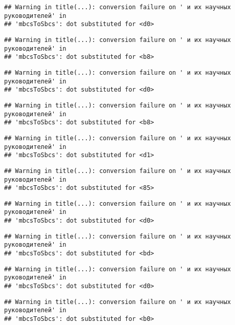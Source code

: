 \documentclass[
]{article}
\begin{document}
\begin{verbatim}
## Warning in title(...): conversion failure on ' и их научных руководителей' in
## 'mbcsToSbcs': dot substituted for <d0>
\end{verbatim}

\begin{verbatim}
## Warning in title(...): conversion failure on ' и их научных руководителей' in
## 'mbcsToSbcs': dot substituted for <b8>
\end{verbatim}

\begin{verbatim}
## Warning in title(...): conversion failure on ' и их научных руководителей' in
## 'mbcsToSbcs': dot substituted for <d0>
\end{verbatim}

\begin{verbatim}
## Warning in title(...): conversion failure on ' и их научных руководителей' in
## 'mbcsToSbcs': dot substituted for <b8>
\end{verbatim}

\begin{verbatim}
## Warning in title(...): conversion failure on ' и их научных руководителей' in
## 'mbcsToSbcs': dot substituted for <d1>
\end{verbatim}

\begin{verbatim}
## Warning in title(...): conversion failure on ' и их научных руководителей' in
## 'mbcsToSbcs': dot substituted for <85>
\end{verbatim}

\begin{verbatim}
## Warning in title(...): conversion failure on ' и их научных руководителей' in
## 'mbcsToSbcs': dot substituted for <d0>
\end{verbatim}

\begin{verbatim}
## Warning in title(...): conversion failure on ' и их научных руководителей' in
## 'mbcsToSbcs': dot substituted for <bd>
\end{verbatim}

\begin{verbatim}
## Warning in title(...): conversion failure on ' и их научных руководителей' in
## 'mbcsToSbcs': dot substituted for <d0>
\end{verbatim}

\begin{verbatim}
## Warning in title(...): conversion failure on ' и их научных руководителей' in
## 'mbcsToSbcs': dot substituted for <b0>
\end{verbatim}
\end{document}
